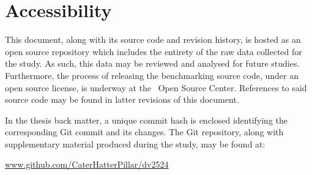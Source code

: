 \section*{Accessibility}
\label{sec:preface_accessibility}
This document, along with its source code and revision history, is hosted as an open source repository which includes the entirety of the raw data collected for the study.
As such, this data may be reviewed and analysed for future studies.
Furthermore, the process of releasing the benchmarking source code, under an open source license, is underway at the \dvttermintel\ Open Source Center.
References to said source code may be found in latter revisions of this document.

In the thesis back matter, a unique commit hash is enclosed identifying the corresponding Git commit and its changes.
The Git repository, along with supplementary material produced during the study, may be found at:
\begin{center}
\href{https://github.com/CaterHatterPillar/dv2524}{www.github.com/CaterHatterPillar/dv2524}
\end{center}
